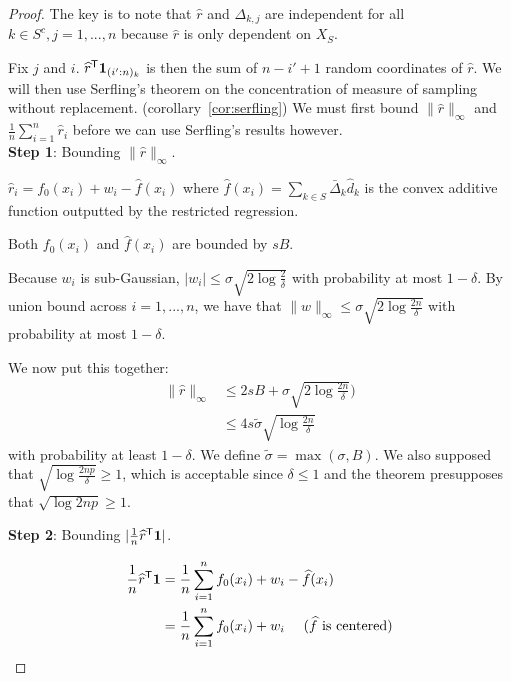 \begin{proof}
The key is to note that $\hat{r}$ and $\Delta_{k,j}$ are independent for all $k \in S^c,j=1,...,n$ because $\hat{r}$ is only dependent on $X_{S}$.

Fix $j$ and $i$. $\widehat{r}^{\mathsf{T}} \mbox{\boldmath $1$}_{(i':n)_k}$ is then the sum of $n-i'+1$ random coordinates of $\hat{r}$. We will then use Serfling's theorem on the concentration of measure of sampling without replacement. (corollary~\ref{cor:serfling}) We must first bound $\| \hat{r} \|_\infty$ and $\frac{1}{n} \sum_{i=1}^n \hat{r}_i$ before we can use Serfling's results however.\\

\textbf{Step 1}: Bounding $\| \hat{r} \|_\infty$. 

$\hat{r}_i = f_0(x_i) + w_i - \hat{f}(x_i)$ where $\hat{f}(x_i) = \sum_{k \in S} \bar{\Delta}_k \hat{d}_k$ is the convex additive function outputted by the restricted regression.

Both $f_0(x_i)$ and $\hat{f}(x_i)$ are bounded by $sB$.

Because $w_i$ is sub-Gaussian, $|w_i| \leq  \sigma \sqrt{2\log \frac{2}{\delta}}$ with probability at most $1-\delta$. By union bound across $i=1,...,n$, we have that $\| w\|_\infty \leq \sigma \sqrt{ 2 \log \frac{2n}{\delta}}$ with probability at most $1 - \delta$.

We now put this together: 
\begin{align}
\| \hat{r} \|_\infty &\leq 2sB + \sigma \sqrt{ 2\log \frac{2n}{\delta}}) \nonumber \\
      &\leq 4 s \tilde{\sigma} \sqrt{\log \frac{2n}{\delta}} \label{eqn:stepone_rhat}
\end{align}
with probability at least $1 - \delta$. We define $\tilde{\sigma} = \max(\sigma, B)$. We also supposed that $\sqrt{\log \frac{2np}{\delta}} \geq 1$, which is acceptable since $\delta \leq 1$ and the theorem presupposes that $\sqrt{ \log 2np } \geq 1$.

\textbf{Step 2}: Bounding $| \frac{1}{n} \widehat{r}^{\mathsf{T}} \mbox{\boldmath $1$} |$. 

\begin{align*}
\frac{1}{n} \widehat{r}^{\mathsf{T}} \mbox{\boldmath $1$} &= 
    \frac{1}{n} \sum_{i=1}^n f_0(x_i) + w_i - \widehat{f}(x_i) \\
  &= \frac{1}{n} \sum_{i=1}^n f_0(x_i) + w_i \quad \textrm{ ($\widehat{f}$ is centered)}
\end{align*}


\end{proof}

